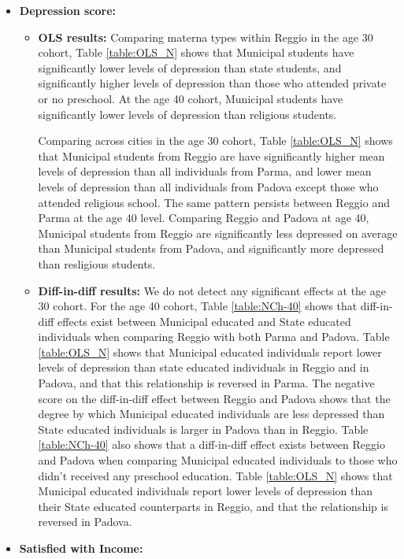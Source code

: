 \documentclass[11pt]{article}
\begin{document}
\begin{itemize}
\item \textbf{Depression score:} 
	
	\begin{itemize}
	\item \textbf{OLS results:} Comparing materna types within Reggio in the age 30 cohort, Table \ref{table:OLS_N} shows that Municipal students have significantly lower levels of depression than state students, and significantly higher levels of depression than those who attended private or no preschool. At the age 40 cohort, Municipal students have significantly lower levels of depression than religious students.

	Comparing across cities in the age 30 cohort, Table \ref{table:OLS_N} shows that Municipal students from Reggio are have significantly higher mean levels of depression than all individuals from Parma, and lower mean levels of depression than all individuals from Padova except those who attended religious school. The same pattern persists between Reggio and Parma at the age 40 level. Comparing Reggio and Padova at age 40, Municipal students from Reggio are significantly less depressed on average than Municipal students from Padova, and significantly more depressed than resligious students.

	\item \textbf{Diff-in-diff results:} We do not detect any significant effects at the age 30 cohort. For the age 40 cohort, Table \ref{table:NCh-40} shows that diff-in-diff effects exist between Municipal educated and State educated individuals when comparing Reggio with both Parma and Padova. Table \ref{table:OLS_N} shows that Municipal educated individuals report lower levels of depression than state educated individuals in Reggio and in Padova, and that this relationship is reversed in Parma. The negative score on the diff-in-diff effect between Reggio and Padova shows that the degree by which Municipal educated individuals are less depressed than State educated individuals is larger in Padova than in Reggio. Table \ref{table:NCh-40} also shows that a diff-in-diff effect exists between Reggio and Padova when comparing Municipal educated individuals to those who didn't received any preschool education. Table \ref{table:OLS_N} shows that Municipal educated individuals report lower levels of depression than their State educated counterparts in Reggio, and that the relationship is reversed in Padova. 
	\end{itemize}

\item \textbf{Satisfied with Income:} 
	

\end{itemize}
\end{document}
